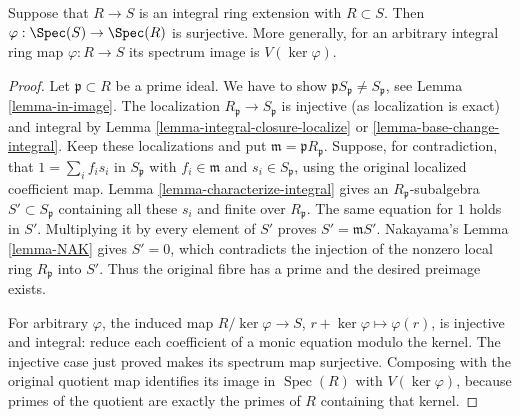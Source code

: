 \begin{lemma}
\label{lemma-integral-overring-surjective}
Suppose that $R \to S$ is an integral
ring extension with $R \subset S$.
Then $\varphi : \Spec(S) \to \Spec(R)$
is surjective. More generally, for an arbitrary integral ring map
$\varphi:R\to S$ its spectrum image is $V(\ker\varphi)$.
\end{lemma}

\begin{proof}
Let $\mathfrak p \subset R$ be a prime ideal.
We have to show $\mathfrak pS_{\mathfrak p} \not = S_{\mathfrak p}$, see
Lemma \ref{lemma-in-image}.
The localization $R_{\mathfrak p} \to S_{\mathfrak p}$ is injective
(as localization is exact) and integral by
Lemma \ref{lemma-integral-closure-localize} or
\ref{lemma-base-change-integral}.
Keep these localizations and put $\mathfrak m=\mathfrak pR_{\mathfrak p}$.
Suppose, for contradiction, that
$1=\sum_i f_is_i$ in $S_{\mathfrak p}$ with
$f_i\in\mathfrak m$ and $s_i\in S_{\mathfrak p}$, using the
original localized coefficient map. Lemma
\ref{lemma-characterize-integral} gives an
$R_{\mathfrak p}$-subalgebra $S'\subset S_{\mathfrak p}$
containing all these $s_i$ and finite over $R_{\mathfrak p}$.
The same equation for $1$ holds in $S'$. Multiplying it by every
element of $S'$ proves $S'=\mathfrak mS'$. Nakayama's
Lemma \ref{lemma-NAK} gives $S'=0$, which contradicts the injection
of the nonzero local ring $R_{\mathfrak p}$ into $S'$.
Thus the original fibre has a prime and the desired preimage exists.

For arbitrary $\varphi$, the induced map
$R/\ker\varphi\to S$, $r+\ker\varphi\mapsto\varphi(r)$,
is injective and integral: reduce each coefficient of a monic
equation modulo the kernel. The injective case just proved makes
its spectrum map surjective. Composing with the original quotient
map identifies its image in $\operatorname{Spec}(R)$ with
$V(\ker\varphi)$, because primes of the quotient are exactly
the primes of $R$ containing that kernel.
\end{proof}